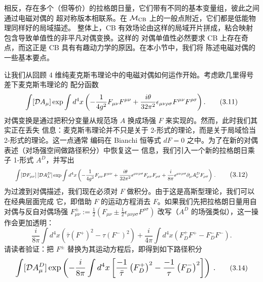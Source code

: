 相反，存在多个（但等价）的拉格朗日量，它们带有不同的基本变量组，彼此之间通过电磁对偶的
超对称版本相联系。在 $\mathcal{M}_{\mathrm{CB}}$ 上的一般点附近，它们都是低能物理同样好的局域描述。
整体上，CB 有效场论由这样的局域开片拼成，粘合映射包含导致单值性的非平凡对偶变换。这样的
对偶单值性必然要求 CB 上存在奇点，而这正是 CB 具有有趣动力学的原因。在本小节中，我们将
陈述电磁对偶的一些基本要点。

让我们从回顾 4 维纯麦克斯韦理论中的电磁对偶如何运作开始。考虑欧几里得号差下麦克斯韦理论的
配分函数
\begin{equation}
  \int[\mathcal{D} A_\mu]\exp\int d^4x\left(
  -\frac{1}{4g^2}F_{\mu\nu}F^{\mu\nu}
  + \frac{i\theta}{32\pi^2}\epsilon_{\mu\nu\rho\sigma}F^{\mu\nu}F^{\rho\sigma}\right).
  \tag{3.11}
\end{equation}
对偶变换是通过把积分变量从规范场 $A$ 换成场强 $F$ 来实现的。然而，此时我们其实正在丢失
信息：麦克斯韦理论并不只是关于 2-形式的理论，而是关于局域恰当 2-形式的理论。这一点通常
编码在 Bianchi 恒等式 $dF=0$ 之中。为了在新的对偶表述（对场强空间做路径积分）中恢复这一
信息，我们引入一个新的拉格朗日乘子 1-形式 $A^D$，并写出
\begin{equation}
  \resizebox{0.82\textwidth}{!}{$\displaystyle
  \int[\cD F_{\mu\nu}]\,[\cD A^D_\lambda]\exp\int d^4x\left(
  -\frac{1}{4g^2}F_{\mu\nu}F^{\mu\nu}
  + \frac{i\theta}{32\pi^2}\epsilon^{\mu\nu\rho\sigma}F_{\mu\nu}F_{\rho\sigma}
  + \frac{i}{8\pi}\epsilon^{\mu\nu\rho\sigma}\partial_\mu A^D_\nu F_{\rho\sigma}\right)\,.$}
  \tag{3.12}
\end{equation}
为过渡到对偶描述，我们现在必须对 $F$ 做积分。由于这是高斯型理论，我们可以在经典层面完成
它，即借助 $F$ 的运动方程消去 $F$。如果我们先把拉格朗日量用自对偶与反自对偶场强
$F^\pm_{\mu\nu} := \frac{1}{2}\left(F_{\mu\nu}\pm\frac{1}{2}\epsilon_{\mu\nu\rho\sigma}F^{\rho\sigma}\right)$
改写（$A^D$ 的场强类似），这一操作会更加透明：
\begin{equation}
  \frac{i}{8\pi}\int d^4x\left(\bar\tau(F^+)^2-\tau(F^-)^2\right)
  + \frac{i}{4\pi}\int d^4x\left(F^+_D F^+ - F^-_D F^-\right).
  \tag{3.13}
\end{equation}
请读者验证：把 $F^\pm$ 替换为其运动方程后，即得到如下路径积分
\begin{equation}
  \resizebox{0.82\textwidth}{!}{$\displaystyle
  \int[\cD A^D_\mu]\exp\left(-\frac{i}{8\pi}\int d^4x
  \left[\frac{-1}{\bar\tau}\left(F^+_D\right)^2-\frac{-1}{\tau}\left(F^-_D\right)^2\right]\right)\,.$}
  \tag{3.14}
\end{equation}

